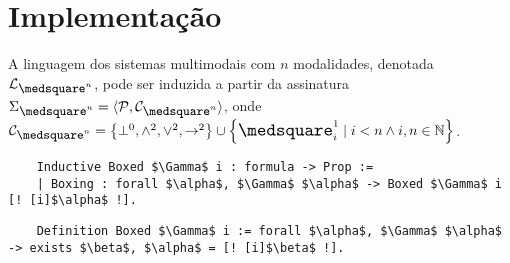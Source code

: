 \chapter{Implementação}

\begin{definition}
    A linguagem dos sistemas multimodais com $n$ modalidades, denotada $\mathcal{L}_{\nec^n}$, pode ser induzida a partir da assinatura $\Sigma_{\nec^n}=\sequence{\mathcal{P},\mathcal{C}_{\nec^n}}$, onde $\mathcal{C}_{\nec^n}=\set{\bot^0,\wedge^2,\vee^2,\to^2}\cup\set{\nec^1_i\mid i<n\wedge i,n\in \mathbb{N}}$.
\end{definition}

\begin{lstlisting}
    Inductive Boxed $\Gamma$ i : formula -> Prop :=
    | Boxing : forall $\alpha$, $\Gamma$ $\alpha$ -> Boxed $\Gamma$ i [! [i]$\alpha$ !].
\end{lstlisting}

\begin{lstlisting}
    Definition Boxed $\Gamma$ i := forall $\alpha$, $\Gamma$ $\alpha$ -> exists $\beta$, $\alpha$ = [! [i]$\beta$ !].
\end{lstlisting}